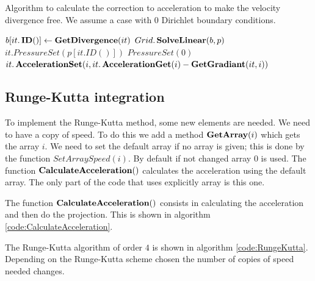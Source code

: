 \begin{algorithm}
\caption{Algorithm to calculate the correction to acceleration to make the velocity divergence free.
We assume a case with 0 Dirichlet boundary conditions.}
\label{code:ProjectAcceleration}
\begin{algorithmic}[1]
				\State $b[it.\mathop{\textbf{ID}}()] \gets \mathop{\textbf{GetDivergence}}(it)$
			\EndIf
		\EndFor
		\State $Grid.\mathop{\textbf{SolveLinear}}(b,p)$
				\State $it.PressureSet(p[it.ID()])$
			\Else
				\State $PressureSet(0)$
			\EndIf
		\EndFor
				\State $it.\mathop{\textbf{AccelerationSet}}(i,it.\mathop{\textbf{AccelerationGet}}(i)-\mathop{\textbf{GetGradiant}}(it,i))$
			\EndFor
		\EndFor
\EndProcedure
			 \end{algorithmic}
\end{algorithm}

\subsection{Runge-Kutta integration}
\label{fixed:sec:rungekutta}

To implement the Runge-Kutta method, some new elements are needed.
We need to have a copy of speed. To do this we add a method $\mathop{\textbf{GetArray}}(i)$ which gets the array $i$.
We need to set the default array if no array is given; this is done by the function $SetArraySpeed(i)$.
By default if not changed array $0$ is used.
The function $\mathop{\textbf{CalculateAcceleration}}()$ calculates the acceleration using the default array.
The only part of the code that uses explicitly array is this one.

The function $\mathop{\textbf{CalculateAcceleration}}()$ consists in calculating the acceleration and then do the projection.
This is shown in algorithm \ref{code:CalculateAcceleration}.

The Runge-Kutta algorithm of order $4$ is shown in algorithm \ref{code:RungeKutta}.
Depending on the Runge-Kutta scheme chosen the number of copies of speed needed changes.

